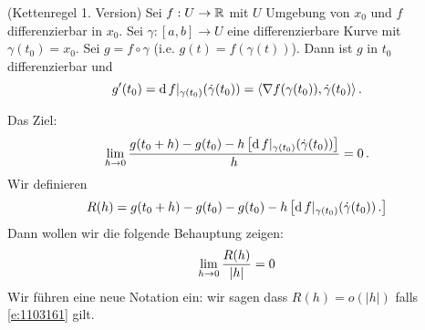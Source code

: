 \begin{Sat}(Kettenregel 1. Version) Sei $f:U\rightarrow\mathbb{R}$ mit $U$ Umgebung von $x_0$ und $f$ differenzierbar in $x_0$. Sei $\gamma:[a,b]\to U$ eine differenzierbare Kurve mit $\gamma(t_0)=x_0$. Sei $g=f\circ \gamma$
(i.e. $g(t)=f(\gamma(t))$). Dann ist $g$ in $t_0$ differenzierbar und
  \[g'(t_0)=\operatorname{d} f|_{\gamma(t_0)}(\dot\gamma(t_0))=\langle \nabla f(\gamma(t_0)),\dot\gamma(t_0) \rangle\, .\]
\end{Sat}
\begin{Bew} Das Ziel:
  \[\displaystyle\lim_{h\rightarrow0} \frac{g(t_0+h)-g(t_0)-h\left[ \operatorname{d} f|_{\gamma(t_0)}(\dot\gamma(t_0)) \right]}{h}=0\, .\]
Wir definieren
  \begin{equation}
    \label{e:1103161}
    R(h)=g(t_0+h)-g(t_0)-g(t_0)-h\left[ \operatorname{d} f|_{\gamma(t_0)}(\dot\gamma(t_0))\, . \right]
  \end{equation}
Dann wollen wir die folgende Behauptung zeigen:
  \begin{equation}
    \label{e:1103162}
    \displaystyle\lim_{h\rightarrow0}\frac{R(h)}{|h|}=0
  \end{equation}
 Wir f\"uhren eine neue Notation ein:
wir sagen dass $R(h) = o (|h|)$ falls \eqref{e:1103161} gilt.


\end{Bew}
